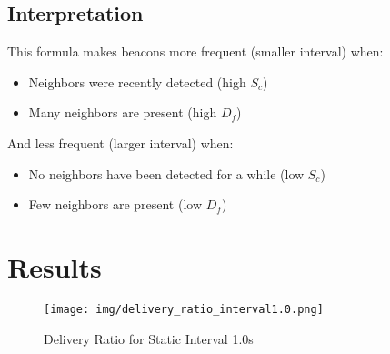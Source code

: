 \documentclass{article}
\begin{document}
\subsection{Interpretation}
This formula makes beacons more frequent (smaller interval) when:
\begin{itemize}
    \item Neighbors were recently detected (high $S_c$)
    \item Many neighbors are present (high $D_f$)
\end{itemize}

And less frequent (larger interval) when:
\begin{itemize}
    \item No neighbors have been detected for a while (low $S_c$)
    \item Few neighbors are present (low $D_f$)
\end{itemize}

\section{Results}
\begin{figure}[H]
    \centering
    \texttt{[image: img/delivery\_ratio\_interval1.0.png]}
    \caption{Delivery Ratio for Static Interval 1.0s}
    \label{fig:delivery_ratio_interval1.0}
\end{figure}
\end{document}
